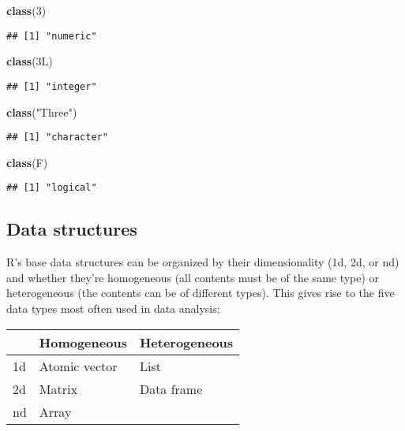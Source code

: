 \documentclass[
]{book}
\newenvironment{Shaded}{\begin{snugshade}}{\end{snugshade}}
\newcommand{\DecValTok}[1]{\textcolor[rgb]{0.00,0.00,0.81}{#1}}
\newcommand{\KeywordTok}[1]{\textcolor[rgb]{0.13,0.29,0.53}{\textbf{#1}}}
\newcommand{\NormalTok}[1]{#1}
\newcommand{\StringTok}[1]{\textcolor[rgb]{0.31,0.60,0.02}{#1}}
\begin{document}
\begin{Shaded}
\begin{Highlighting}[]
\KeywordTok{class}\NormalTok{(}\DecValTok{3}\NormalTok{)}
\end{Highlighting}
\end{Shaded}

\begin{verbatim}
## [1] "numeric"
\end{verbatim}

\begin{Shaded}
\begin{Highlighting}[]
\KeywordTok{class}\NormalTok{(3L)}
\end{Highlighting}
\end{Shaded}

\begin{verbatim}
## [1] "integer"
\end{verbatim}

\begin{Shaded}
\begin{Highlighting}[]
\KeywordTok{class}\NormalTok{(}\StringTok{"Three"}\NormalTok{)}
\end{Highlighting}
\end{Shaded}

\begin{verbatim}
## [1] "character"
\end{verbatim}

\begin{Shaded}
\begin{Highlighting}[]
\KeywordTok{class}\NormalTok{(F)}
\end{Highlighting}
\end{Shaded}

\begin{verbatim}
## [1] "logical"
\end{verbatim}

\hypertarget{data-structures}{%
\subsection{Data structures}\label{data-structures}}

R's base data structures can be organized by their dimensionality (1d, 2d, or nd) and whether they're homogeneous (all contents must be of the same type) or heterogeneous (the contents can be of different types). This gives rise to the five data types most often used in data analysis:

\begin{longtable}[]{@{}lll@{}}
\toprule
& Homogeneous & Heterogeneous\tabularnewline
\midrule
\endhead
1d & Atomic vector & List\tabularnewline
2d & Matrix & Data frame\tabularnewline
nd & Array &\tabularnewline
\bottomrule
\end{longtable}
\end{document}
